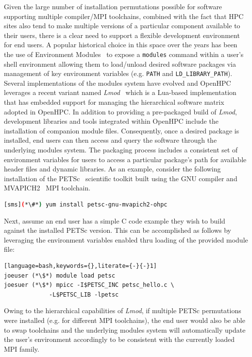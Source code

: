 \documentclass{sig-alternate-05-2015}
\begin{document}
\noindent
Given the large number of installation permutations possible for software
supporting multiple compiler/MPI toolchains, combined with the fact that HPC
sites also tend to make multiple versions of a particular component available
to their users, there is a clear need to support a flexible development environment for end
users. A popular historical choice in this space over the years has been the
use of Environment Modules~\cite{furlani_1996} to expose a \texttt{modules}
command within a user's shell environment allowing them to load/unload desired
software packages via management of key environment variables
(e.g. \texttt{{PATH}} and \texttt{{LD\_LIBRARY\_PATH}}). Several
implementations of the modules system have evolved and OpenHPC leverages a
recent variant named {\em Lmod}~\cite{tacc_sc_best_practices:2011,lmod_url}
which is a Lua-based implementation that has embedded support for managing the
hierarchical software matrix adopted in OpenHPC.  In addition to providing a
pre-packaged build of {\em Lmod}, development libraries and tools integrated
within OpenHPC include the installation of companion module files.
Consequently, once a desired package is installed, end users can then access
and query the software through the underlying modules system. The packaging
process includes a consistent set of environment variables for users to
access a particular package's path for available header files and dynamic
libraries. As an example, consider the following installation of the
PETSc~\cite{PETSc_url} scientific toolkit built using the GNU compiler and
MVAPICH2~\cite{MVAPICH_url} MPI toolchain.

\begin{lstlisting}[language=bash,keywords={}]
[sms](*\#*) yum install petsc-gnu-mvapich2-ohpc
\end{lstlisting}

\noindent
Next, assume an end user has a simple C code example they wish to build against
the installed PETSc version. This can be accomplished as follows by leveraging
the environment variables enabled thru loading of the provided module file:

\begin{lstlisting}[language=bash,keywords={},literate={-}{-}1]
joeuser (*\$*) module load petsc
joesuer (*\$*) mpicc -I$PETSC_INC petsc_hello.c \
             -L$PETSC_LIB -lpetsc
\end{lstlisting}

Owing to the hierarchical capabilities of {\em Lmod}, if multiple PETSc
permutations were installed (e.g. for different MPI toolchains), the end user
would also be able to swap toolchains and the underlying modules system will
automatically update the user's environment accordingly to be consistent with
the currently loaded MPI family.
\end{document}
